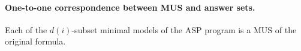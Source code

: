 \documentclass{article}
\begin{document}
\paragraph{One-to-one correspondence between MUS and answer sets.}
Each of the $d(i)$-subset minimal models of the ASP program is a MUS of the original formula. 


 

\end{document}
